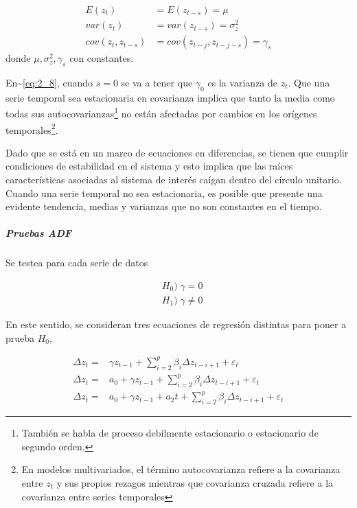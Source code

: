 \documentclass[
  oneside]{article}
\begin{document}
\begin{align}
    \label{eq:2_7}
    E(z_{t})&=E(z_{t-s})=\mu\\
    \label{eq:2_8}
    var(z_t)&=var(z_{t-s})=\sigma^2_z\\
    \label{eq:2_9}
    cov(z_t,z_{t-s})&=cov(z_{t-j},z_{t-j-s})=\gamma_s
\end{align} donde \(\mu, \sigma^2_z, \gamma_s\) con constantes.

En\textasciitilde{}\eqref{eq:2_8}, cuando \(s=0\) se va a tener que
\(\gamma_0\) es la varianza de \(z_t\). Que una serie temporal sea
estacionaria en covarianza implica que tanto la media como todas sus
autocovarianzas\footnote{También se habla de proceso debilmente estacionario o estacionario de segundo orden.}
no están afectadas por cambios en los orígenes
temporales\footnote{En modelos multivariados, el término autocovarianza refiere a la covarianza entre $z_t$ y sus propios rezagos mientras que covarianza cruzada refiere a la covarianza entre series temporales}.

Dado que se está en un marco de ecuaciones en diferencias, se tienen que
cumplir condiciones de estabilidad en el sistema y esto implica que las
raíces características asociadas al sistema de interés caígan dentro del
círculo unitario. Cuando una serie temporal no sea estacionaria, es
posible que presente una evidente tendencia, medias y varianzas que no
son constantes en el tiempo.

\hypertarget{pruebas-adf}{%
\subparagraph{Pruebas ADF}\label{pruebas-adf}}

Se testea para cada serie de datos

\begin{align*}
    &H_0)\; \gamma = 0\\
    &H_1)\; \gamma \neq 0   
\end{align*}

En este sentido, se consideran tres ecuaciones de regresión distintas
para poner a prueba \(H_0\),

\begin{align}
    \label{eq: modelo_c}
    \Delta z_t=&\gamma z_{t-1} + \sum_{i=2}^p \beta_i \Delta z_{t-i+1} + \varepsilon_t \\
    \label{eq: modelo_b}
    \Delta z_t=&a_0+\gamma z_{t-1} + \sum_{i=2}^p \beta_i \Delta z_{t-i+1} + \varepsilon_t \\
    \label{eq: modelo_a}
    \Delta z_t=&a_0+\gamma z_{t-1} + a_2 t+ \sum_{i=2}^p \beta_i \Delta z_{t-i+1} + \varepsilon_t
\end{align}
\end{document}
